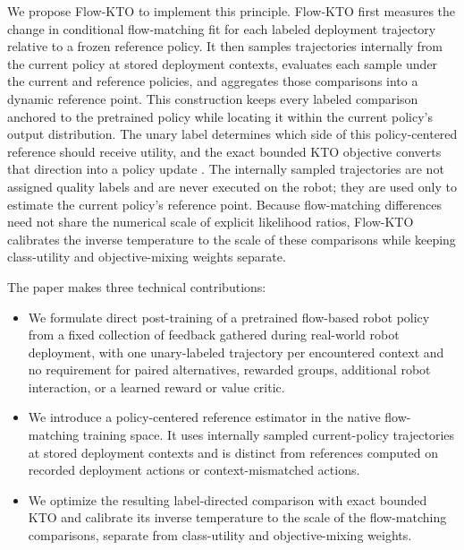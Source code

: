 We propose Flow-KTO to implement this principle. Flow-KTO first measures the
change in conditional flow-matching fit for each labeled deployment trajectory
relative to a frozen reference policy. It then samples trajectories internally
from the current policy at stored deployment contexts, evaluates each sample
under the current and reference policies, and aggregates those comparisons into
a dynamic reference point. This construction keeps every labeled comparison
anchored to the pretrained policy while locating it within the current policy's
output distribution. The unary label determines which side of this
policy-centered reference should receive utility, and the exact bounded KTO
objective converts that direction into a policy update
\cite{ethayarajh2024kto}. The internally sampled trajectories are not assigned
quality labels and are never executed on the robot; they are used only to
estimate the current policy's reference point. Because
flow-matching differences need not share the numerical scale of explicit
likelihood ratios, Flow-KTO calibrates the inverse temperature to the scale of
these comparisons while keeping class-utility and objective-mixing weights
separate.

The paper makes three technical contributions:

\begin{itemize}
    \item We formulate direct post-training of a pretrained flow-based robot
    policy from a fixed collection of feedback gathered during real-world robot
    deployment, with one unary-labeled trajectory per encountered context and no
    requirement for paired alternatives, rewarded groups, additional robot
    interaction, or a learned reward or value critic.
    \item We introduce a policy-centered reference estimator in the native
    flow-matching training space. It uses internally sampled current-policy
    trajectories at stored deployment contexts and is distinct from references
    computed on recorded deployment actions or context-mismatched actions.
    \item We optimize the resulting label-directed comparison with exact
    bounded KTO and calibrate its inverse temperature to the scale of the
    flow-matching comparisons, separate from class-utility and objective-mixing
    weights.
\end{itemize}
